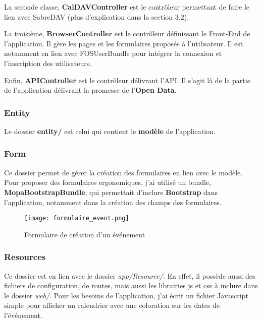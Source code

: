 La seconde classe, \textbf{CalDAVController} est le contrôleur permettant de faire le lien avec SabreDAV (plus d'explication dans la section 3.2).

La troisième, \textbf{BrowserController} est le contrôleur définissant le Front-End de l'application. Il gère les pages et les formulaires proposés à l'utilisateur. Il est notamment en lien avec FOSUserBundle pour intégrer la connexion et l'inscription des utilisateurs.

Enfin, \textbf{APIController} est le contrôleur délivrant l'API. Il s'agit là de la partie de l'application délivrant la promesse de l'\textbf{Open Data}.

\subsubsection*{Entity}

Le dossier \textbf{entity/} est celui qui contient le \textbf{modèle} de l'application.


\subsubsection*{Form}

Ce dossier permet de gérer la création des formulaires en lien avec le modèle. Pour proposer des formulaires ergonomiques, j'ai utilisé un bundle, \textbf{MopaBootstrapBundle}, qui permettait d'inclure \textbf{Bootstrap} dans l'application, notamment dans la création des champs des formulaires.

\begin{figure}[H]
\begin{center}
\texttt{[image: formulaire\_event.png]}
\end{center}
\caption{Formulaire de création d'un événement}
\end{figure}

\subsubsection*{Resources}

Ce dossier est en lien avec le dossier \textit{app/Resource/}. En effet, il possède aussi des fichiers de configuration, de routes, mais aussi les librairies js et css à inclure dans le dossier \textit{web/}. Pour les besoins de l'application, j'ai écrit un fichier Javascript simple pour afficher un calendrier avec une coloration sur les dates de l'événement.

